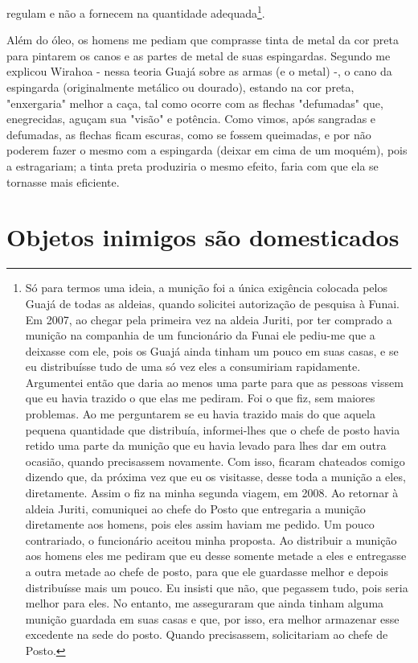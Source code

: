 regulam e não a fornecem na quantidade adequada\footnote{Só para termos
  uma ideia, a munição foi a única exigência colocada pelos Guajá de
  todas as aldeias, quando solicitei autorização de pesquisa à Funai. Em
  2007, ao chegar pela primeira vez na aldeia Juriti, por ter comprado a
  munição na companhia de um funcionário da Funai ele pediu-me que a
  deixasse com ele, pois os Guajá ainda tinham um pouco em suas casas, e
  se eu distribuísse tudo de uma só vez eles a consumiriam rapidamente.
  Argumentei então que daria ao menos uma parte para que as pessoas
  vissem que eu havia trazido o que elas me pediram. Foi o que fiz, sem
  maiores problemas. Ao me perguntarem se eu havia trazido mais do que
  aquela pequena quantidade que distribuía, informei-lhes que o chefe de
  posto havia retido uma parte da munição que eu havia levado para lhes
  dar em outra ocasião, quando precisassem novamente. Com isso, ficaram
  chateados comigo dizendo que, da próxima vez que eu os visitasse,
  desse toda a munição a eles, diretamente. Assim o fiz na minha segunda
  viagem, em 2008. Ao retornar à aldeia Juriti, comuniquei ao chefe do
  Posto que entregaria a munição diretamente aos homens, pois eles assim
  haviam me pedido. Um pouco contrariado, o funcionário aceitou minha
  proposta. Ao distribuir a munição aos homens eles me pediram que eu
  desse somente metade a eles e entregasse a outra metade ao chefe de
  posto, para que ele guardasse melhor e depois distribuísse mais um
  pouco. Eu insisti que não, que pegassem tudo, pois seria melhor para
  eles. No entanto, me asseguraram que ainda tinham alguma munição
  guardada em suas casas e que, por isso, era melhor armazenar esse
  excedente na sede do posto. Quando precisassem, solicitariam ao chefe
  de Posto.}.

Além do óleo, os homens me pediam que comprasse tinta de metal da cor
preta para pintarem os canos e as partes de metal de suas espingardas.
Segundo me explicou Wirahoa - nessa teoria Guajá sobre as armas (e o
metal) -, o cano da espingarda (originalmente metálico ou dourado),
estando na cor preta, "enxergaria" melhor a caça, tal como ocorre com as
flechas "defumadas" que, enegrecidas, aguçam sua "visão" e potência.
Como vimos, após sangradas e defumadas, as flechas ficam escuras, como
se fossem queimadas, e por não poderem fazer o mesmo com a espingarda
(deixar em cima de um moquém), pois a estragariam; a tinta preta
produziria o mesmo efeito, faria com que ela se tornasse mais eficiente.

\section{Objetos inimigos são domesticados}

